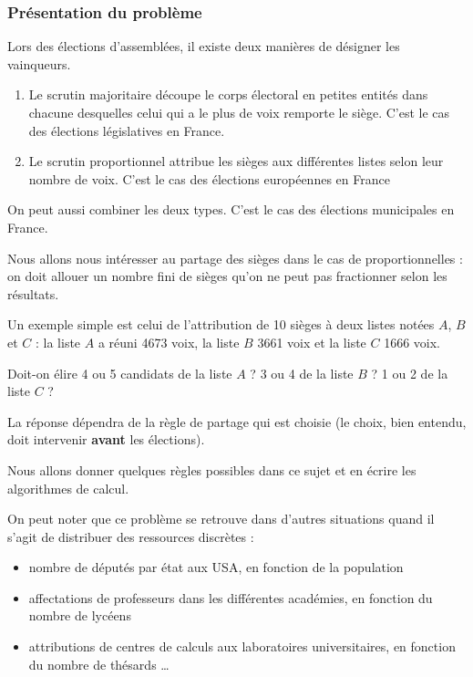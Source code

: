 \subsubsection{Présentation du problème}
Lors des élections d'assemblées, il existe deux manières de désigner les vainqueurs.
\begin{enumerate}
    \item Le scrutin majoritaire découpe le corps électoral en petites entités dans chacune desquelles celui qui a le plus de voix remporte le siège. C'est le cas des élections législatives en France.
    \item Le scrutin proportionnel attribue les sièges aux différentes listes selon leur nombre de voix. C'est le cas des élections européennes en France
\end{enumerate}

On peut aussi combiner les deux types. C'est le cas des élections municipales en France.

\medskip

Nous allons nous intéresser au partage des sièges dans le cas de proportionnelles : on doit allouer un nombre fini de sièges qu'on ne peut pas fractionner selon les résultats.

Un exemple simple est celui de l'attribution de 10 sièges à deux listes notées $A$, $B$ et $C$ : la liste $A$ a réuni 4673 voix, la liste $B$ 3661 voix et la liste $C$ 1666 voix. 

Doit-on élire 4 ou 5 candidats de la liste $A$ ? 3 ou 4 de la liste $B$ ? 1 ou 2 de la liste $C$ ?

La réponse dépendra de la règle de partage qui est choisie (le choix, bien entendu, doit intervenir {\bf avant} les élections).

Nous allons donner quelques règles possibles dans ce sujet et en écrire les algorithmes de calcul.

\medskip

On peut noter que ce problème se retrouve dans d'autres situations quand il s'agit de distribuer des ressources discrètes :
\begin{itemize}
    \item nombre de députés par état aux USA, en fonction de la population
    \item affectations de professeurs dans les différentes académies, en fonction du nombre de lycéens
    \item attributions de centres de calculs aux laboratoires universitaires, en fonction du nombre de thésards \dots
\end{itemize}
